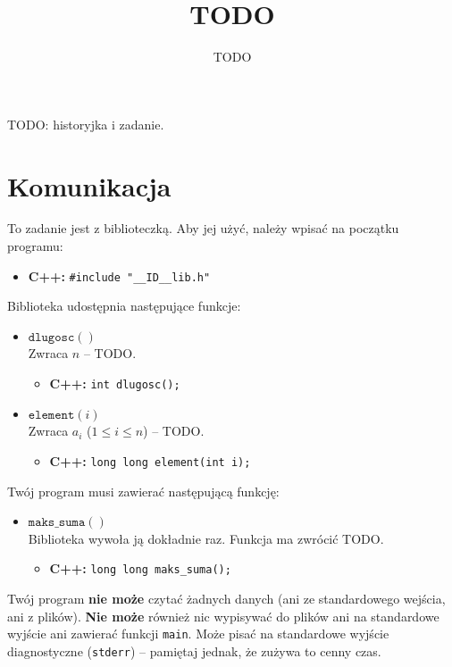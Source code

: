 \documentclass[zad,zawodnik,utf8,pl]{sinol}
\title{TODO}
\date{TODO}
\begin{document}
\begin{tasktext}
	\vspace{-0.5cm}
	\noindent {}

	\noindent TODO: historyjka i zadanie. \\

	\section{Komunikacja}
	To zadanie jest z biblioteczką. Aby jej użyć, należy wpisać na początku programu:
	\begin{itemize}
        \item \textbf{C++:}
            \verb|#include "__ID__lib.h"|
    \end{itemize}
	Biblioteka udostępnia następujące funkcje:
	\begin{itemize}
        \item $\texttt{dlugosc}()$ \\
            Zwraca $n$ -- TODO.
            \begin{itemize}
                \item \textbf{C++:}
		                \texttt{int dlugosc();}
            \end{itemize}
        \item $\texttt{element}(i)$ \\
            Zwraca $a_i$ ($1 \leq i \leq n$) -- TODO.
            \begin{itemize}
                \item \textbf{C++:}
		                \texttt{long long element(int i);}
            \end{itemize}
    \end{itemize}
	Twój program musi zawierać następującą funkcję:
	\begin{itemize}
        \item $\texttt{maks\_suma}()$ \\
            Biblioteka wywoła ją dokładnie raz. Funkcja ma zwrócić TODO.
            \begin{itemize}
                \item \textbf{C++:}
		                \texttt{long long maks\_suma();}
            \end{itemize}
    \end{itemize}

	\noindent Twój program \textbf{nie może} czytać żadnych danych
    (ani ze standardowego wejścia, ani z plików).
    \textbf{Nie może} również nic wypisywać do plików ani na standardowe wyjście
    ani zawierać funkcji \texttt{main}.
    Może pisać na standardowe wyjście diagnostyczne
    (\texttt{stderr}) -- pamiętaj jednak, że zużywa to cenny czas.\\


\end{tasktext}
\end{document}

